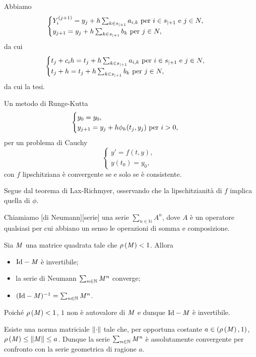 \Proof Abbiamo
\[
\begin{cases}
	Y_i^{(j + 1)} = y_j + h\sum_{k \in {s}_{|+ 1}} a_{i,k}\text{ per }i \in {s}_{|+ 1}\text{ e }j \in N,\\
	y_{j + 1} = y_j + h\sum_{k \in {s}_{|+ 1}} b_k\text{ per }j \in N,
\end{cases}
\]
da cui
\[
\begin{cases}
	t_j + c_i h = t_j + h\sum_{k \in {s}_{|+ 1}} a_{i,k}\text{ per }i \in {s}_{|+ 1}\text{ e }j \in N,\\
	t_j + h = t_j + h\sum_{k \in {s}_{|+ 1}} b_k\text{ per }j \in N,
\end{cases}
\]
da cui la tesi. \EndProof
\begin{Theorem}
	Un metodo di Runge-Kutta
	\[
	\begin{cases}
		y_0 = y_0,\\
		y_{j + 1} = y_j + h\phi_h(t_j,y_j)\text{ per }i > 0,
	\end{cases}
	\]
	per un problema di Cauchy
	\[
	\begin{cases}
		y' = f(t,y),\\
		y(t_0) = y_0,
	\end{cases}
	\]
	con $f$ lipschitziana \`e convergente se e solo se \`e consistente.
\end{Theorem}
\Proof Segue dal teorema di Lax-Richmyer, osservando che la lipschitzianit\`a di $f$ implica quella di $\phi$. \EndProof
\begin{Definition}
	Chiamiamo [di Neumann][serie] una serie $\sum_{n \in \mathbb{N}} A^n$, dove $A$ \`e un operatore qualsiasi per cui abbiano un senso le operazioni di somma e composizione.
\end{Definition}
\begin{Lemma}
	Sia $\mathit{M}$ una matrice quadrata tale che $\rho \left ( \mathit{M} \right ) < 1$. Allora
	\begin{itemize}
		\item $\Identity - \Matrix$ \`e invertibile;
		\item la serie di Neumann $\sum_{n \in \mathbb{N}} \mathit{M}^n$ converge;
		\item $(\Identity - \Matrix)^{-1} = \sum_{n \in \mathbb{N}} \Matrix^n$.
	\end{itemize}
\end{Lemma}
\Proof Poich\'e $\rho \left ( \mathit{M} \right ) < 1$, $1$ non \`e autovalore di $\mathit{M}$ e dunque $\Identity - \Matrix$ \`e invertibile.
\par Esiste una norma matriciale $\Norm{\cdot}$ tale che, per opportuna costante $a \in (\rho \left ( \mathit{M} \right ),1)$, $\SpectralRadius{\Matrix} \leq \Norm{\Matrix} \leq a$. Dunque la serie $\sum_{n \in \mathbb{N}} \mathit{M}^n$ \`e assolutamente convergente per confronto con la serie geometrica di ragione $a$.
